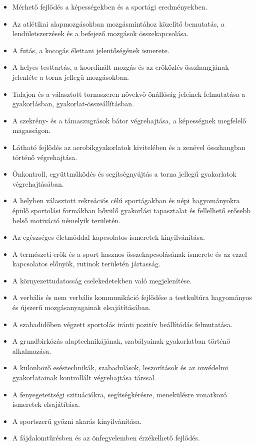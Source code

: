 \begin{itemize}
\item Mérhető fejlődés a képességekben és a sportági eredményekben.
\item Az atlétikai alapmozgásokban mozgásmintához közelítő bemutatás, a lendületszerzések és a befejező mozgások összekapcsolása.
\item A futás, a kocogás élettani jelentőségének ismerete.
\item A helyes testtartás, a koordinált mozgás és az erőközlés összhangjának jelenléte a torna jellegű mozgásokban.
\item Talajon és a választott tornaszeren növekvő önállóság jeleinek felmutatása a gyakorlásban, gyakorlat-összeállításban.
\item A szekrény- és a támaszugrások bátor végrehajtása, a képességnek megfelelő magasságon.
\item Látható fejlődés az aerobikgyakorlatok kivitelében és a zenével összhangban történő végrehajtása.
\item Önkontroll, együttműködés és segítségnyújtás a torna jellegű gyakorlatok végrehajtásában.
\item A helyben választott rekreációs célú sportágakban és népi hagyományokra épülő sportolási formákban bővülő gyakorlási tapasztalat és fellelhető erősebb belső motiváció némelyik területén.
\item Az egészséges életmóddal kapcsolatos ismeretek kinyilvánítása.
\item A természeti erők és a sport hasznos összekapcsolásának ismerete és az ezzel kapcsolatos előnyök, rutinok területén jártasság.
\item A környezettudatosság cselekedetekben való megjelenítése.
\item A verbális és nem verbális kommunikáció fejlődése a testkultúra hagyományos és újszerű mozgásanyagainak elsajátításában.
\item A szabadidőben végzett sportolás iránti pozitív beállítódás felmutatása.
\item A grundbirkózás alaptechnikájának, szabályainak gyakorlatban történő alkalmazása.
\item A különböző eséstechnikák, szabadulások, leszorítások és az önvédelmi gyakorlatainak kontrollált végrehajtása társsal.
\item A fenyegetettségi szituációkra, segítségkérésre, menekülésre vonatkozó ismeretek elsajátítása.
\item A sportszerű győzni akarás kinyilvánítása.
\item A fájdalomtűrésben és az önfegyelemben érzékelhető fejlődés.
\end{itemize}
